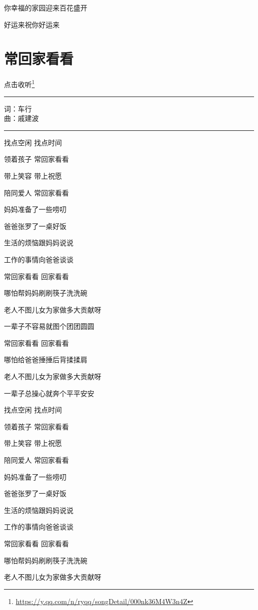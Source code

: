 \documentclass[]{ctexbook}
\renewcommand{\href}[2]{#2\footnote{\url{#1}}}
\begin{document}
你幸福的家园迎来百花盛开

好运来祝你好运来

\section*{常回家看看}\label{often-back-home}


\href{https://y.qq.com/n/ryqq/songDetail/000nk36M4W3n4Z}{点击收听}

\begin{center}\rule{0.5\linewidth}{0.5pt}\end{center}

词：车行\\
曲：戚建波

\begin{center}\rule{0.5\linewidth}{0.5pt}\end{center}

找点空闲 找点时间

领着孩子 常回家看看

带上笑容 带上祝愿

陪同爱人 常回家看看

妈妈准备了一些唠叨

爸爸张罗了一桌好饭

生活的烦恼跟妈妈说说

工作的事情向爸爸谈谈

常回家看看 回家看看

哪怕帮妈妈刷刷筷子洗洗碗

老人不图儿女为家做多大贡献呀

一辈子不容易就图个团团圆圆

常回家看看 回家看看

哪怕给爸爸捶捶后背揉揉肩

老人不图儿女为家做多大贡献呀

一辈子总操心就奔个平平安安

找点空闲 找点时间

领着孩子 常回家看看

带上笑容 带上祝愿

陪同爱人 常回家看看

妈妈准备了一些唠叨

爸爸张罗了一桌好饭

生活的烦恼跟妈妈说说

工作的事情向爸爸谈谈

常回家看看 回家看看

哪怕帮妈妈刷刷筷子洗洗碗

老人不图儿女为家做多大贡献呀
\end{document}
